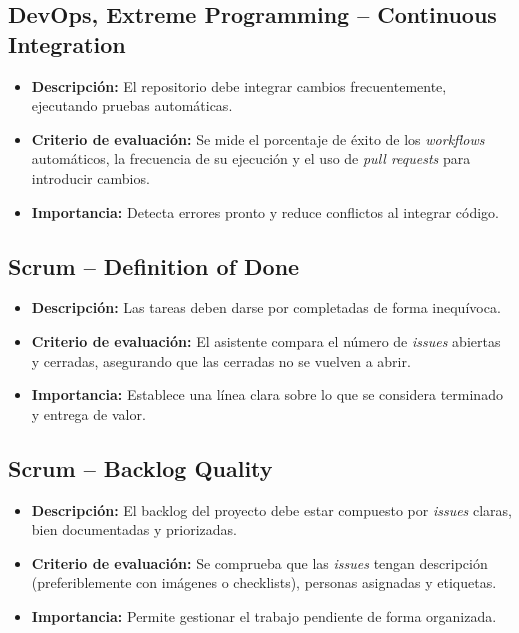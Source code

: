 \subsection{DevOps, Extreme Programming – Continuous Integration}

\begin{itemize}
  \item \textbf{Descripción:} El repositorio debe integrar cambios frecuentemente, ejecutando pruebas automáticas.
  \item \textbf{Criterio de evaluación:} Se mide el porcentaje de éxito de los \textit{workflows} automáticos, la frecuencia de su ejecución y el uso de \textit{pull requests} para introducir cambios.
  \item \textbf{Importancia:} Detecta errores pronto y reduce conflictos al integrar código.
\end{itemize}

\subsection{Scrum – Definition of Done}

\begin{itemize}
  \item \textbf{Descripción:} Las tareas deben darse por completadas de forma inequívoca.
  \item \textbf{Criterio de evaluación:} El asistente compara el número de \textit{issues} abiertas y cerradas, asegurando que las cerradas no se vuelven a abrir.
  \item \textbf{Importancia:} Establece una línea clara sobre lo que se considera terminado y entrega de valor.
\end{itemize}

\subsection{Scrum – Backlog Quality}

\begin{itemize}
  \item \textbf{Descripción:} El backlog del proyecto debe estar compuesto por \textit{issues} claras, bien documentadas y priorizadas.
  \item \textbf{Criterio de evaluación:} Se comprueba que las \textit{issues} tengan descripción (preferiblemente con imágenes o checklists), personas asignadas y etiquetas.
  \item \textbf{Importancia:} Permite gestionar el trabajo pendiente de forma organizada.
\end{itemize}


